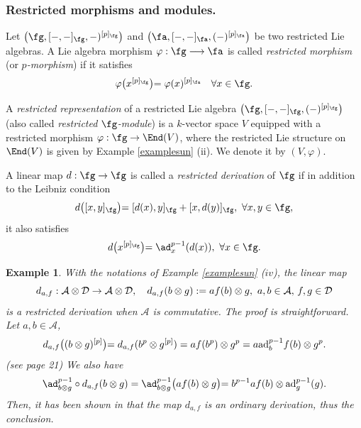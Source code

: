 \documentclass[12pt]{article}
\newcommand {\A}{{\cal{A}}}
\newcommand{\D}{{\cal{D}}}
\newtheorem{example}[theorem]{Example}
\begin{document}
\subsubsection{Restricted morphisms and modules.}
Let $\left( \fg,[-,-]_\fg,-)^{[p]_\fg}\right) $ and $\left( \fa,[-,-]_\fa,(-)^{[p]_\fa}\right) $ be two restricted Lie algebras. A Lie algebra morphism $\varphi:\fg\longrightarrow \fa$ is called \textit{restricted morphism} (or \textit{$p$-morphism}) if it satisfies 
\begin{equation*}
\varphi\bigl(x^{[p]_\fg} \bigl)=\varphi(x)^{[p]_\fa}\quad\forall x\in \fg.
\end{equation*}

A \textit{restricted representation} of a restricted Lie algebra $\left( \fg,[-,-]_\fg,(-)^{[p]_\fg}\right) $ (also called \textit{restricted $\fg$-module}) is a $k$-vector space $V$ equipped with a restricted morphism $\varphi:\fg\rightarrow\End(V)$, where the restricted Lie structure on $\End(V)$ is given by Example \ref{examplesun} (ii). We denote it by $(V,\varphi)$.



A linear map $d:\fg\rightarrow \fg$ is called a \textit{restricted derivation} of $\fg$  if in addition to the Leibniz condition
 \begin{equation*}
    d\bigl([x,y]_\fg\bigl)=[d(x),y]_\fg+[x,d(y)]_\fg,~\forall x,y\in \fg,
\end{equation*} it also satisfies
\begin{equation*}
    d\bigl(x^{[p]_\fg}\bigl)=\ad_x^{p-1}(d(x)),~\forall x\in \fg.
\end{equation*}
\begin{example} With the notations of Example \ref{examplesun} ($iv$), the linear map
    \begin{equation}\label{eq:JDJderivation}
d_{a,f}:\A\otimes\D\rightarrow\A\otimes\D,\quad d_{a,f}(b\otimes g):=af(b)\otimes g,\,\,a,b \in \mathcal{A},\,f,g\in \mathcal{D}
    \end{equation} is a restricted derivation \emph{when} $\mathcal{A}$ \emph{is commutative}.
The proof is straightforward. Let $a,b \in \mathcal{A}$,
        \begin{align*}
            d_{a,f}\bigl((b\otimes g)^{[p]}\bigl)=d_{a,f}(b^p\otimes g^{[p]})=af(b^p)\otimes g^{p}= a {\rm ad}_b^{p-1}f(b)\otimes g^p.
        \end{align*} 
        (see \cite{J} page 21)
        We also have
        \begin{align*}
            \ad^{p-1}_{b\otimes g}\circ d_{a,f}(b\otimes g)=\ad^{p-1}_{b\otimes g}\bigl(af(b)\otimes g\bigl)=b^{p-1}af(b)\otimes {\rm ad}_g^{p-1}(g).
        \end{align*}
    Then, it has been shown in \cite[Theorem 3.1]{JZ} that the map $d_{a,f}$ is an ordinary derivation, thus the conclusion.
\end{example}
    
\end{document}
